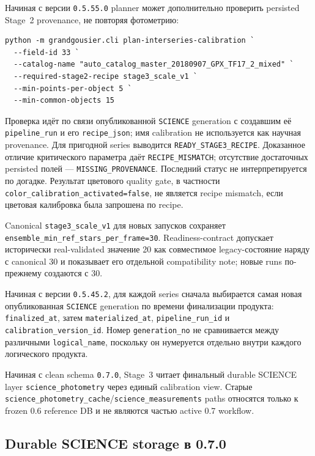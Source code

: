 Начиная с версии \texttt{0.5.55.0} planner может дополнительно проверить persisted Stage~2 provenance, не повторяя фотометрию:

\begin{lstlisting}
python -m grandgousier.cli plan-interseries-calibration `
  --field-id 33 `
  --catalog-name "auto_catalog_master_20180907_GPX_TF17_2_mixed" `
  --required-stage2-recipe stage3_scale_v1 `
  --min-points-per-object 5 `
  --min-common-objects 15
\end{lstlisting}

Проверка идёт по связи опубликованной \texttt{SCIENCE} generation с создавшим её \texttt{pipeline\_run} и его \texttt{recipe\_json}; имя calibration не используется как научная provenance. Для пригодной series выводится \texttt{READY\_STAGE3\_RECIPE}. Доказанное отличие критического параметра даёт \texttt{RECIPE\_MISMATCH}; отсутствие достаточных persisted полей --- \texttt{MISSING\_PROVENANCE}. Последний статус не интерпретируется по догадке. Результат цветового quality gate, в частности \texttt{color\_calibration\_activated=false}, не является recipe mismatch, если цветовая калибровка была запрошена по recipe.

Canonical \texttt{stage3\_scale\_v1} для новых запусков сохраняет \texttt{ensemble\_min\_ref\_stars\_per\_frame=30}. Readiness-contract допускает исторически real-validated значение 20 как совместимое legacy-состояние наряду с canonical 30 и показывает его отдельной compatibility note; новые runs по-прежнему создаются с 30.

Начиная с версии \texttt{0.5.45.2}, для каждой series сначала выбирается самая новая опубликованная \texttt{SCIENCE} generation по времени финализации продукта: \texttt{finalized\_at}, затем \texttt{materialized\_at}, \texttt{pipeline\_run\_id} и \texttt{calibration\_version\_id}. Номер \texttt{generation\_no} не сравнивается между различными \texttt{logical\_name}, поскольку он нумеруется отдельно внутри каждого логического продукта.

Начиная с clean schema \texttt{0.7.0}, Stage~3 читает финальный durable SCIENCE layer
\texttt{science\_photometry} через единый calibration view. Старые
\texttt{science\_photometry\_cache}/\texttt{science\_measurements} paths относятся
только к frozen 0.6 reference DB и не являются частью active 0.7 workflow.

\subsection{Durable SCIENCE storage в 0.7.0}

